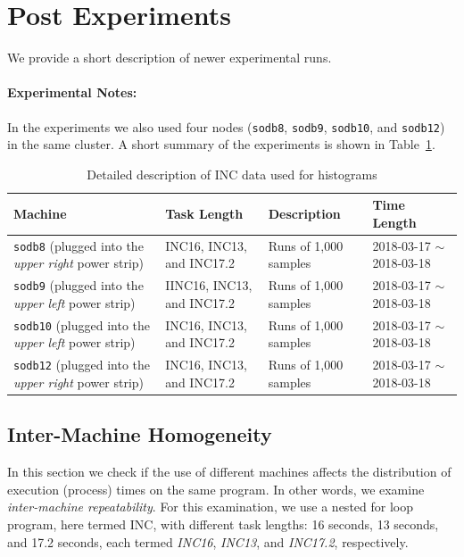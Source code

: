 
\clearpage
\newpage

\section{Post Experiments}

We provide a short description of newer experimental runs. 

\paragraph{Experimental Notes:} In the experiments 
we also used four nodes ({\tt sodb8}, {\tt sodb9}, {\tt sodb10}, and {\tt sodb12}) in the same cluster. 
A short summary of the experiments is shown in Table~\ref{tab:exp_notes2}.

\begin{table}[h]
\begin{center}
\begin{tabular}{|p{4cm}|p{3cm}|p{4cm}|p{4cm}|} \hline
Machine & Task Length & Description & Time Length\\ \hline
{\tt sodb8} (plugged into the {\em upper right} power strip) &  INC16, INC13, and INC17.2 & Runs of 1,000 samples & 2018-03-17 $\sim$2018-03-18\\ \hline
{\tt sodb9}  (plugged into the {\em upper left} power strip) &  IINC16, INC13, and INC17.2 & Runs of 1,000 samples & 2018-03-17 $\sim$2018-03-18\\ \hline
{\tt sodb10} (plugged into the {\em upper left} power strip)  & INC16, INC13, and INC17.2 & Runs of 1,000 samples & 2018-03-17 $\sim$2018-03-18\\ \hline
{\tt sodb12} (plugged into the {\em upper right} power strip) & INC16, INC13, and INC17.2 & Runs of 1,000 samples & 2018-03-17 $\sim$2018-03-18\\ \hline
\end{tabular}
\end{center}
\vspace{-.2in}
\caption{Detailed description of INC data used for histograms\label{tab:exp_notes2}}
\end{table}

\subsection{Inter-Machine Homogeneity~\label{sec:diff_machine}} 

In this section we check if the use of different machines affects the distribution of execution (process) times on the same program. 
In other words, we examine {\em inter-machine repeatability}. For this examination, we use a nested for loop program, here termed INC, 
with different task lengths: 16 seconds, 13 seconds, and 17.2 seconds, each termed {\em INC16}, {\em INC13}, and {\em INC17.2}, respectively. 

